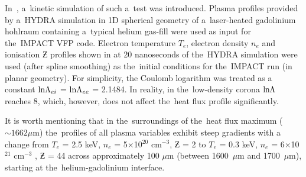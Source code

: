 In~\cite{Brodrick_PoP2017}, a~kinetic simulation of such a~test was introduced.
Plasma profiles provided by a~HYDRA simulation in 1D spherical
geometry of a~laser-heated gadolinium hohlraum containing a~typical helium 
gas-fill were used as input for the~IMPACT \cite{Kingham_JCP2004} VFP code. 
Electron temperature $T_e$, electron density $n_e$ and ionisation $\Zbar$ 
profiles shown in  at 20 nanoseconds of 
the~HYDRA simulation were used (after spline smoothing) as 
the~initial conditions for the~IMPACT run (in planar geometry). 
For simplicity, the Coulomb logarithm was treated as a
constant $\text{ln}\Lambda_{ei}$ = $\text{ln}\Lambda_{ee}$ = 2.1484. In reality, in the~low-density 
corona $\text{ln}\Lambda$ reaches 8, which, however, does not affect the~heat flux profile 
significantly. 

It is worth mentioning that in the~surroundings of the~heat flux maximum 
($\sim 1662 \mu$m) the~profiles of all plasma variables exhibit steep gradients 
with a change from $T_e$ = 2.5 keV, $n_e$ = 5$\times$10$^{20}$ cm$^{−3}$, 
$\Zbar$ = 2 to $T_e$ = 0.3 keV, $n_e$ = 6$\times$10$^{21}$ cm$^{−3}$ , 
$\Zbar$ = 44 across approximately 100 $\mu$m 
(between 1600~$\mu$m and 1700~$\mu$m), starting at the~helium-gadolinium 
interface.  



